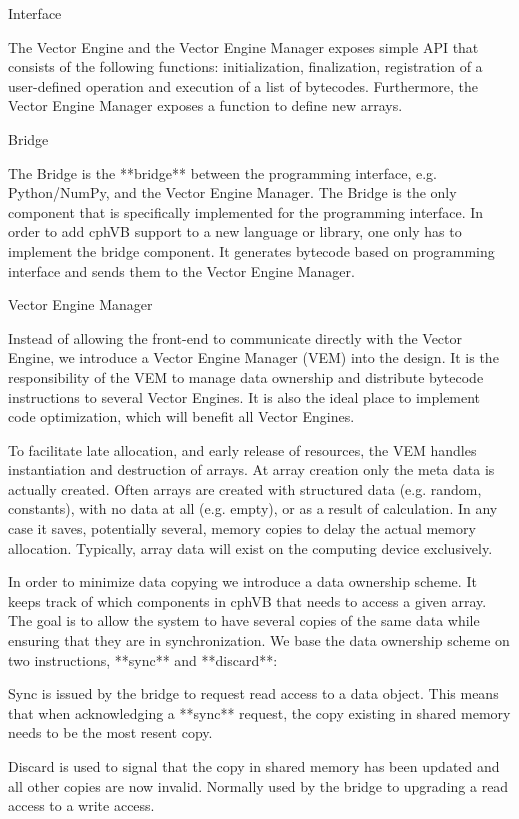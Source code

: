 Interface
~~~~~~~~~

The Vector Engine and the Vector Engine Manager exposes simple API that consists of the following functions: initialization, finalization, registration of a user-defined operation and execution of a list of bytecodes. Furthermore, the Vector Engine Manager exposes a function to define new arrays.

Bridge
~~~~~~

The Bridge is the **bridge** between the programming interface, e.g. Python/NumPy, and the Vector Engine Manager. The Bridge is the only component that is specifically implemented for the programming interface. In order to add cphVB support to a new language or library, one only has to implement the bridge component. It generates bytecode based on programming interface and sends them to the Vector Engine Manager.

Vector Engine Manager
~~~~~~~~~~~~~~~~~~~~~

Instead of allowing the front-end to communicate directly with the Vector Engine, we introduce a Vector Engine Manager (VEM) into the design. It is the responsibility of the VEM to manage data ownership and distribute bytecode instructions to several Vector Engines. It is also the ideal place to implement code optimization, which will benefit all Vector Engines.

To facilitate late allocation, and early release of resources, the VEM handles instantiation and destruction of arrays. At array creation only the meta data is actually created. Often arrays are created with structured data (e.g. random, constants), with no data at all (e.g. empty), or as a result of calculation. In any case it saves, potentially several, memory copies to delay the actual memory allocation. Typically, array data will exist on the computing device exclusively.

In order to minimize data copying we introduce a data ownership scheme. It keeps track of which components in cphVB that needs to access a given array. The goal is to allow the system to have several copies of the same data while ensuring that they are in synchronization. We base the data ownership scheme on two instructions, **sync** and **discard**:

Sync 
  is issued by the bridge to request read access to a data object. This means that when acknowledging a **sync** request, the copy existing in shared memory needs to be the most resent copy.

Discard
  is used to signal that the copy in shared memory has been updated and all other copies are now invalid. Normally used by the bridge to upgrading a read access to a write access.

